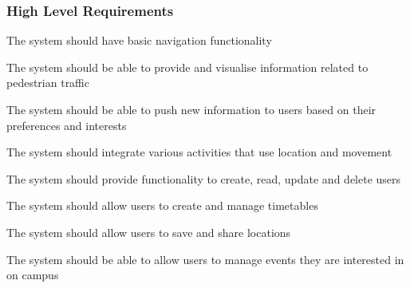 \documentclass{article}
\begin{document}
	\subsubsection{High Level Requirements}
 	\begin{FR}
 		\item The system should have basic navigation functionality 
 		\item The system should be able to provide and visualise information related to pedestrian traffic
 		\item The system should be able to push new information to users based on their preferences and interests
 		\item The system should integrate various activities that use location and movement
 		\item The system should provide functionality to create, read, update and delete users 
 		\item The system should allow users to create and manage timetables
 		\item The system should allow users to save and share locations
 		\item The system should be able to allow users to manage events they are interested in on campus
 	\end{FR}
\end{document}
